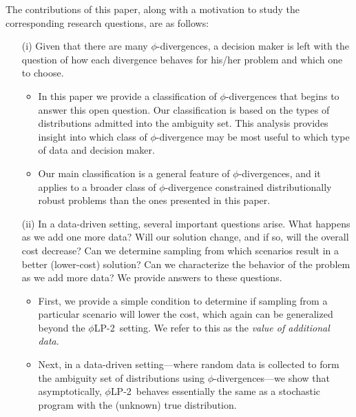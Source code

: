 \documentclass[opre,nonblindrev]{informs3} %
\newcommand{\plp}{$\phi$LP-2}
\begin{document}


The contributions of this paper, along with a motivation to study the corresponding research questions, are as follows:
\begin{itemize}
\item[(i)] 
Given that there are many $\phi$-divergences, a decision maker is left with the question of how each divergence behaves for his/her problem and which one to choose.
	\begin{itemize}
		\item In this paper we provide a classification of $\phi$-divergences that begins to answer this open question.
Our classification is based on the types of distributions admitted into the ambiguity set.
This analysis provides insight into which class of $\phi$-divergence may be most useful to which type of data and decision maker.
\item Our main classification is a general feature of $\phi$-divergences, and it applies to a broader class of $\phi$-divergence constrained distributionally robust problems than the ones presented in this paper. 
\end{itemize}

\item[(ii)] In a data-driven setting, several important questions arise.
		What happens as we add one more data?
		Will our solution change, and if so, will the overall cost decrease?
		Can we determine sampling from which scenarios result in a better (lower-cost) solution?
		Can we characterize the behavior of the problem as we add more data?
		We provide answers to these questions.

		\begin{itemize}
			\item First, we provide a simple condition to determine if sampling from a particular scenario will lower the cost, which again can be generalized beyond the \plp\ setting.
		We refer to this as the {\it value of additional data}. 
			\item Next, in a data-driven setting---where random data is collected to form the ambiguity set of distributions using $\phi$-divergences---we show that asymptotically, \plp\  behaves essentially the same as a stochastic program with the (unknown) true distribution.
		\end{itemize}



\end{itemize}
\end{document}
